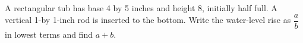 A rectangular tub has base 4 by 5 inches and height 8, initially half full. A vertical 1-by 1-inch rod is inserted to the bottom. Write the water-level rise as $\dfrac{a}{b}$ in lowest terms and find $a+b$.
